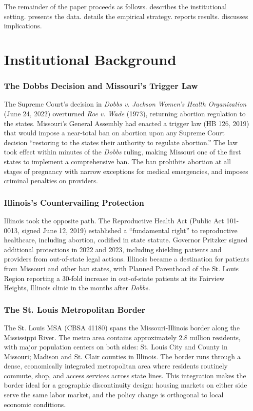 \documentclass[12pt]{article}
\begin{document}
The remainder of the paper proceeds as follows.  describes the institutional setting.  presents the data.  details the empirical strategy.  reports results.  discusses implications.

\section{Institutional Background}
\label{sec:background}

\subsubsection*{The Dobbs Decision and Missouri's Trigger Law} The Supreme Court's decision in \textit{Dobbs v. Jackson Women's Health Organization} (June 24, 2022) overturned \textit{Roe v. Wade} (1973), returning abortion regulation to the states. Missouri's General Assembly had enacted a trigger law (HB 126, 2019) that would impose a near-total ban on abortion upon any Supreme Court decision ``restoring to the states their authority to regulate abortion.'' The law took effect within minutes of the \textit{Dobbs} ruling, making Missouri one of the first states to implement a comprehensive ban. The ban prohibits abortion at all stages of pregnancy with narrow exceptions for medical emergencies, and imposes criminal penalties on providers.

\subsubsection*{Illinois's Countervailing Protection} Illinois took the opposite path. The Reproductive Health Act (Public Act 101-0013, signed June 12, 2019) established a ``fundamental right'' to reproductive healthcare, including abortion, codified in state statute. Governor Pritzker signed additional protections in 2022 and 2023, including shielding patients and providers from out-of-state legal actions. Illinois became a destination for patients from Missouri and other ban states, with Planned Parenthood of the St. Louis Region reporting a 30-fold increase in out-of-state patients at its Fairview Heights, Illinois clinic in the months after \textit{Dobbs}.

\subsubsection*{The St. Louis Metropolitan Border} The St. Louis MSA (CBSA 41180) spans the Missouri-Illinois border along the Mississippi River. The metro area contains approximately 2.8 million residents, with major population centers on both sides: St. Louis City and County in Missouri; Madison and St. Clair counties in Illinois. The border runs through a dense, economically integrated metropolitan area where residents routinely commute, shop, and access services across state lines. This integration makes the border ideal for a geographic discontinuity design: housing markets on either side serve the same labor market, and the policy change is orthogonal to local economic conditions.
\end{document}

